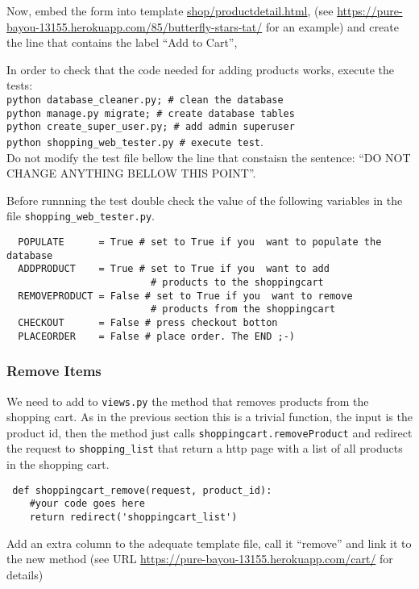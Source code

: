 \documentclass[12pt]{article} %
\newcommand{\ttt}[1]{\texttt{#1}}%
\newcommand{\views}{\texttt{views.py}}%
\begin{document}
Now, embed the form into template \url{shop/productdetail.html},
(see \url{https://pure-bayou-13155.herokuapp.com/85/butterfly-stars-tat/} for an example) and create the line that contains the label ``Add to Cart'',

In order to check that the code needed for adding products works, execute the tests:\\
\ttt{python database\_cleaner.py; \# clean the database\\
python manage.py migrate; \# create database tables\\
python create\_super\_user.py; \# add admin superuser\\
python  shopping\_web\_tester.py \# execute test}.\\ Do not modify the test file bellow the line that constaisn the sentence: ``DO NOT CHANGE ANYTHING BELLOW THIS POINT''.

Before runnning the test double check the value of the following variables in the file \ttt{shopping\_web\_tester.py}.
\begin{verbatim}
  POPULATE      = True # set to True if you  want to populate the database
  ADDPRODUCT    = True # set to True if you  want to add
                         # products to the shoppingcart
  REMOVEPRODUCT = False # set to True if you  want to remove
                         # products from the shoppingcart
  CHECKOUT      = False # press checkout botton
  PLACEORDER    = False # place order. The END ;-)
\end{verbatim}
 
\subsubsection{Remove Items}
We need to add to \views{} the method that removes products from the shopping cart. As in the previous section this is a trivial function, the input is the product id, then the method just calls \ttt{shoppingcart.removeProduct} and redirect the request to \ttt{shopping\_list} that return a http page with a list of all products in the shopping cart.

\begin{lstlisting}
 def shoppingcart_remove(request, product_id):
    #your code goes here
    return redirect('shoppingcart_list')
\end{lstlisting}
Add an extra column to the adequate template file, call it ``remove'' and link it to the new method (see URL \url{https://pure-bayou-13155.herokuapp.com/cart/} for details)
\end{document}
